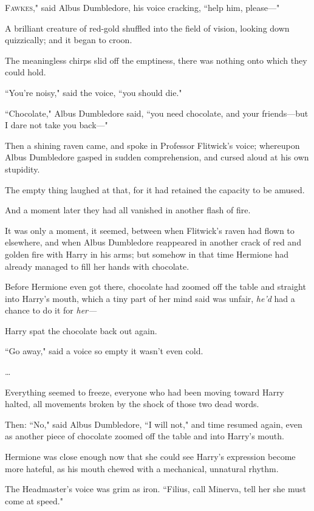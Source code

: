 
\lettrine[ante=``]{F}{awkes,"} said Albus Dumbledore, his voice cracking, ``help him, please---"

A brilliant creature of red-gold shuffled into the field of vision, looking down quizzically; and it began to croon.

The meaningless chirps slid off the emptiness, there was nothing onto which they could hold.

``You're noisy," said the voice, ``you should die."

``Chocolate," Albus Dumbledore said, ``you need chocolate, and your friends---but I dare not take you back---"

Then a shining raven came, and spoke in Professor Flitwick's voice; whereupon Albus Dumbledore gasped in sudden comprehension, and cursed aloud at his own stupidity.

The empty thing laughed at that, for it had retained the capacity to be amused.

And a moment later they had all vanished in another flash of fire.

\later

It was only a moment, it seemed, between when Flitwick's raven had flown to elsewhere, and when Albus Dumbledore reappeared in another crack of red and golden fire with Harry in his arms; but somehow in that time Hermione had already managed to fill her hands with chocolate.

Before Hermione even got there, chocolate had zoomed off the table and straight into Harry's mouth, which a tiny part of her mind said was unfair, \emph{he'd} had a chance to do it for \emph{her---}

Harry spat the chocolate back out again.

``Go away," said a voice so empty it wasn't even cold.

{\ldots}

Everything seemed to freeze, everyone who had been moving toward Harry halted, all movements broken by the shock of those two dead words.

Then: ``No," said Albus Dumbledore, ``I will not," and time resumed again, even as another piece of chocolate zoomed off the table and into Harry's mouth.

Hermione was close enough now that she could see Harry's expression become more hateful, as his mouth chewed with a mechanical, unnatural rhythm.

The Headmaster's voice was grim as iron. ``Filius, call Minerva, tell her she must come at speed."


